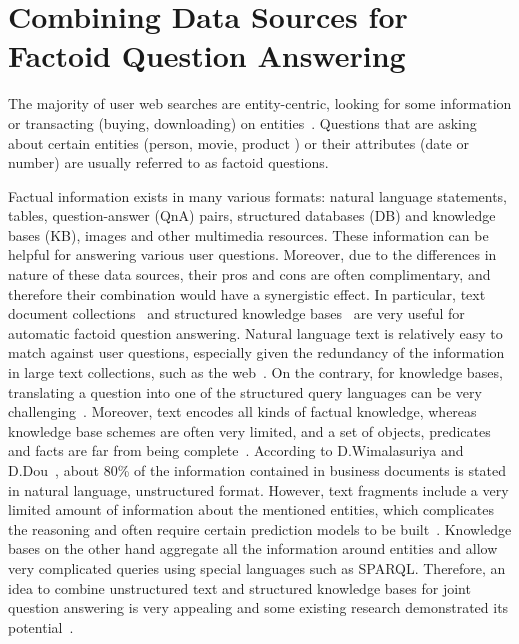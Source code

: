 %

\chapter{Combining Data Sources for Factoid Question Answering}
\label{chapter:factoid}

\noindent

The majority of user web searches are entity-centric, \ie looking for some information or transacting (\eg buying, downloading) on entities~\cite{pound2010ad}.
Questions that are asking about certain entities (\eg person, movie, product \etc) or their attributes (\eg date or number) are usually referred to as factoid questions.

Factual information exists in many various formats: natural language statements, tables, question-answer (QnA) pairs, structured databases (DB) and knowledge bases (KB), images and other multimedia resources.
These information can be helpful for answering various user questions.
Moreover, due to the differences in nature of these data sources, their pros and cons are often complimentary, and therefore their combination would have a synergistic effect.
In particular, text document collections~\cite{Kolomiyets:2011:SQA:2046840.2047162} and structured knowledge bases~\cite{unger2014introduction} are very useful for automatic factoid question answering.
Natural language text is relatively easy to match against user questions, especially given the redundancy of the information in large text collections, such as the web~\cite{lin2007exploration}.
On the contrary, for knowledge bases, translating a question into one of the structured query languages can be very challenging~\cite{BerantCFL13:sempre}.
Moreover, text encodes all kinds of factual knowledge, whereas knowledge base schemes are often very limited, and a set of objects, predicates and facts are far from being complete~\cite{Dong:2014:KVW:2623330.2623623}.
According to D.Wimalasuriya and D.Dou~\cite{wimalasuriya2010ontology}, about 80\% of the information contained in business documents is stated in natural language, \ie unstructured format.
However, text fragments include a very limited amount of information about the mentioned entities, which complicates the reasoning and often require certain prediction models to be built~\cite{LiRoth02}.
Knowledge bases on the other hand aggregate all the information around entities and allow very complicated queries using special languages such as SPARQL.
Therefore, an idea to combine unstructured text and structured knowledge bases for joint question answering is very appealing and some existing research demonstrated its potential~\cite{baudivs2015yodaqa,elbassuoni2009language,fader2013paraphrase,ferrucci2010building,Sun:2015:ODQ:2736277.2741651}.

